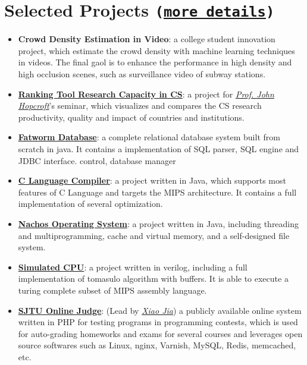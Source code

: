 \documentclass[letterpaper]{article}
\begin{document}
\section*{Selected Projects \normalsize{\tt(\href{https://github.com/lostleaf?tab=repositories}{more details})}}
\begin{itemize}
\item \textbf{Crowd Density Estimation in Video}:
a college student innovation project, which estimate the crowd density with machine learning techniques in videos. The final gaol is to enhance the performance in high density and high occlusion scenes, such as surveillance video of subway stations.
\item \textbf{\href{http://acm.sjtu.edu.cn/ricsrt/}{Ranking Tool Research Capacity in CS}}:
a project for \emph{\href{http://www.cs.cornell.edu/jeh/}{Prof. John Hopcroft}}'s seminar, which visualizes and compares the CS research productivity, quality and impact of countries and institutions.
\item \textbf{\href{https://github.com/lostleaf/fatworm}{Fatworm Database}}:
a complete relational database system built from scratch in java. It contains a implementation of SQL parser, SQL engine and JDBC interface.
control, database manager
\item \textbf{\href{https://github.com/lostleaf/compiler}{C Language Compiler}}:
a project written in Java, which supports most features of C Language and targets the MIPS architecture. It contains a full implementation of several optimization.
\item \textbf{\href{https://github.com/lostleaf/nachos}{Nachos Operating System}}: 
a project written in Java, including threading and multiprogramming, cache and virtual memory, and a self-designed file system.
\item \textbf{\href{https://github.com/lostleaf/cpu}{Simulated CPU}}:
a project written in verilog, including a full implementation of tomasulo algorithm with buffers. It is able to execute a turing complete subset of MIPS assembly language.
\item \textbf{\href{http://acm.sjtu.edu.cn/OnlineJudge/}{SJTU Online Judge}}: (Lead by \emph{\href{http://xiao-jia.com/}{Xiao Jia}}) a publicly available online system written in PHP for testing programs in programming contests, which is used for auto-grading homeworks and exams for several courses and leverages open source softwares such as Linux, nginx, Varnish, MySQL, Redis, memcached, etc.
\end{itemize}
\end{document}
